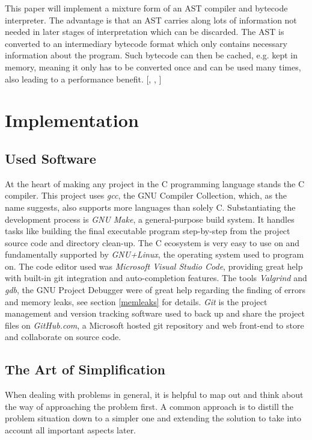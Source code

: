 \documentclass[12pt,a4paper]{article}
\begin{document}
This paper will implement a mixture form of an AST compiler and bytecode
interpreter. The advantage is that an AST carries along lots of information
not needed in later stages of interpretation which can be discarded. The AST
is converted to an intermediary bytecode format which only contains
necessary information about the program. Such bytecode can then be cached,
e.g. kept in memory, meaning it only has to be converted once and can be
used many times, also leading to a performance benefit.
[, , ]

\section{Implementation}
\subsection{Used Software}
At the heart of making any project in the C programming language
stands the C compiler. This project uses
\emph{gcc}, the GNU Compiler Collection, which, as the name suggests, also 
supports more languages than solely C. Substantiating the development process is 
\emph{GNU Make}, a general-purpose build system. It handles tasks like building
the final executable program step-by-step from the project source code and directory clean-up.
The C ecosystem is very easy to use on and fundamentally supported by 
\emph{GNU+Linux}, the operating system used to program on.
The code editor used was \emph{Microsoft Visual Studio Code}, providing great
help with built-in git integration and auto-completion features.
The tools \emph{Valgrind} and \emph{gdb}, the GNU Project Debugger were of great help
regarding the finding of errors and memory leaks, see section \ref{memleaks} for details.
\emph{Git} is the project management and version tracking software used to back up and share
the project files on \emph{GitHub.com}, a Microsoft hosted git repository and
web front-end to store and collaborate on source code.

\subsection{The Art of Simplification}
When dealing with problems in general, it is helpful to map out and think about
the way of approaching the problem first. A common approach is to distill the
problem situation down to a simpler one and extending the solution to take into
account all important aspects later.
\end{document}
